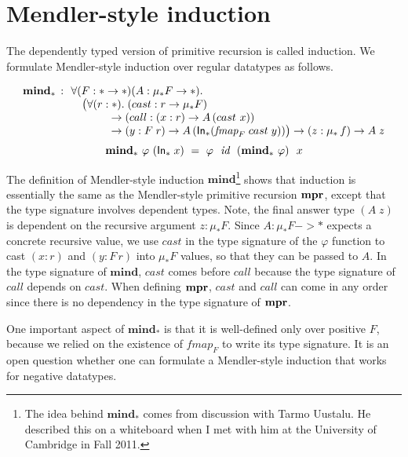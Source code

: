 \section{Mendler-style induction}
\label{sec:relwork:dep}
The dependently typed version of primitive recursion is called induction.
We formulate Mendler-style induction over regular datatypes as follows.
\vspace*{-2em}
\begin{singlespace}
\[\begin{array}{ll}
\textbf{mind}_{*} \, :
& \!\!\forall (F:* -> *) (A: \mu_{*}F -> *). \\
& ~~ \big(\forall(r:*).\;(cast : r -> \mu_{*}F) \\
& ~\qquad\quad -> (call : (x:r) -> A\,(cast~x)) \\
& ~\qquad\quad -> (y: F\;r) -> A\,(\mathsf{In}_{*}(\textit{fmap}_{F}\;cast\;y)) \big) 
-> (z:\mu_{*}\,f) -> A\;z
\end{array}
\]
\[
\textbf{mind}_{*} ~ \varphi ~ (\mathsf{In}_{*}\;x)
  ~=~ \varphi~~\textit{id}~~(\textbf{mind}_{*}~\varphi)~~x \]
\end{singlespace}\noindent
The definition of Mendler-style induction $\textbf{mind}$\footnote{
	The idea behind $\textbf{mind}_{*}$ comes from discussion with
	Tarmo Uustalu. He described this on a whiteboard when I met with him
	at the University of Cambridge in Fall 2011.}
shows that induction is essentially the same as
the Mendler-style primitive recursion $\mathbf{mpr}$, except
that the type signature involves dependent types.
Note, the final answer type $(A\;z)$ is dependent on
the recursive argument $z:\mu_{*}F$.
Since $A: \mu_{*}F -> *$ expects a concrete recursive value,
we use $cast$ in the type signature of the $\varphi$ function
to cast $(x:r)$ and $(y:F\,r)$ into $\mu_{*}F$ values, so that
they can be passed to $A$.
In the type signature of $\textbf{mind}$, $cast$ comes before $call$
because the type signature of $call$ depends on $cast$.
When defining $\mathbf{mpr}$, $cast$ and $call$ can come in any order
since there is no dependency in the type signature of $\mathbf{mpr}$.

One important aspect of $\textbf{mind}_{*}$ is that
it is well-defined only over positive $F$, because we relied on
the existence of $\textit{fmap}_F$ to write its type signature.
It is an open question whether one can formulate a Mendler-style induction
that works for negative datatypes.

